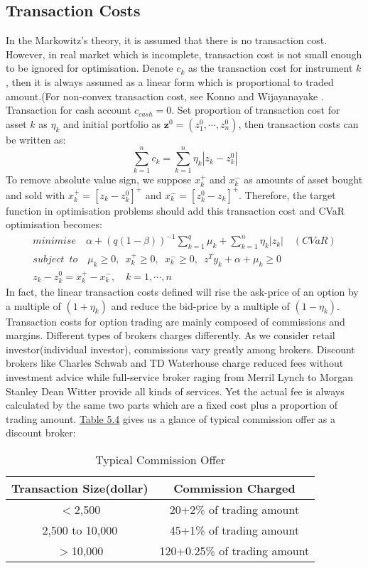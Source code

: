 \subsection{Transaction Costs}
In the Markowitz's theory, it is assumed that there is no transaction cost. However, in real market which is incomplete, transaction cost is not small enough to be ignored for optimisation. Denote $c_k$ as the transaction cost for instrument $k$, then it is always assumed as a linear form which is proportional to traded amount.(For non-convex transaction cost, see Konno and Wijayanayake \cite{17}. Transaction for cash account $c_{cash}=0$. Set proportion of transaction cost for asset $k$ as $\eta_k$ and initial portfolio as $\textbf{z}^0=(z_1^0,\cdots,z_n^0)$, then transaction costs can be written as:
\begin{equation}
\sum_{k=1}^nc_k=\sum_{k=1}^n\eta_k|z_k-z_k^0|
\end{equation} 
To remove absolute value sign, we suppose $x_k^+$ and $x_k^-$ as amounts of asset bought and sold with $x_k^+=[z_k-z_k^0]^+$ and $x_k^-=[z_k^0-z_k]^+$. Therefore, the target function in optimisation problems should add this transaction cost and CVaR optimisation becomes:
\begin{align} 
minimise \quad \alpha+(q(1-\beta))^{-1}\sum_{k=1}^{q}\mu_k+\sum_{k=1}^n\eta_k|z_k| \quad(CVaR)\nonumber 
\\ subject \enspace to \quad \mu_k\geq0,\enspace x_k^+\geq0, \enspace x_k^-\geq0,\enspace z^Ty_k+\alpha+\mu_k\geq0\nonumber
\\z_k-z_k^0=x_k^+-x_k^-, \quad k=1,\cdots,n
\end{align}
In fact, the linear transaction costs defined will rise the ask-price of an option by a multiple of $(1+\eta_k)$ and reduce the bid-price by a multiple of $(1-\eta_k)$. Transaction costs for option trading are mainly composed of commissions and margins. Different types of brokers charges differently. As we consider retail investor(individual investor), commissions vary greatly among brokers. Discount brokers like Charles Schwab and TD Waterhouse charge reduced fees without investment advice while full-service broker raging from Merril Lynch to Morgan Stanley Dean Witter provide all kinds of services. Yet the actual fee is always calculated by the same two parts which are a fixed cost plus a proportion of trading amount. \hyperref[Table 5.4]{Table 5.4} gives us a glance of typical commission offer as a discount broker:
\begin{table}[h!]\label{5.4}
\centering
\begin{tabular}{||c c ||} 
 \hline
Transaction Size(dollar)  & Commission Charged \\ [0.5ex] 
 \hline\hline
 $<$2,500  &20+2\% of trading amount\\ 
2,500 to 10,000  &45+1\% of trading amount\\
$>$10,000 &120+0.25\% of trading amount\\
  [0.5ex] 
 \hline
\end{tabular}
\caption{Typical Commission Offer}
\label{table:1}
\end{table}

